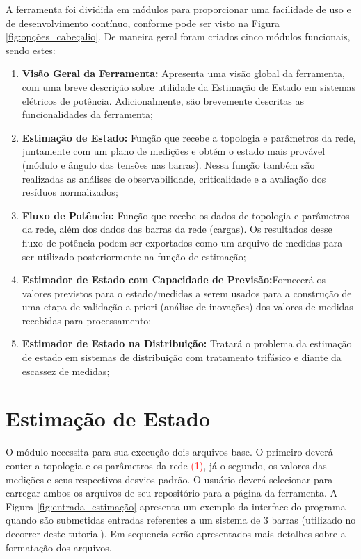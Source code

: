 \documentclass{article}
\begin{document}
A ferramenta foi dividida em módulos para proporcionar uma facilidade de uso e de desenvolvimento contínuo, conforme pode ser visto na Figura \ref{fig:opções_cabeçalio}. De maneira geral foram criados cinco módulos funcionais, sendo estes:
\begin{enumerate}
    \item \textbf{Visão Geral da Ferramenta:} Apresenta uma visão global da ferramenta, com uma breve descrição sobre utilidade da Estimação de Estado em sistemas elétricos de potência. Adicionalmente, são brevemente descritas as funcionalidades da ferramenta;
    \item \textbf{Estimação de Estado:} Função que recebe a topologia e parâmetros da rede, juntamente com um plano de medições e obtém o estado mais provável (módulo e ângulo das tensões nas barras). Nessa função também são realizadas as análises de observabilidade, criticalidade e a avaliação dos resíduos normalizados;
    \item \textbf{Fluxo de Potência:} Função que recebe os dados de topologia e parâmetros da rede, além dos dados das barras da rede (cargas). Os resultados desse fluxo de potência podem ser exportados como um arquivo de medidas para ser utilizado posteriormente na função de estimação;
    \item \textbf{Estimador de Estado com Capacidade de Previsão:}Fornecerá os valores previstos para o estado/medidas a serem usados para a construção de uma etapa de validação a priori (análise de inovações) dos valores de medidas recebidas para processamento;
    \item \textbf{Estimador de Estado na Distribuição:} Tratará o problema da estimação de estado em sistemas de distribuição com tratamento trifásico e diante da escassez de medidas;
\end{enumerate}


\section{Estimação de Estado}

O módulo  necessita para sua execução  dois arquivos base. O primeiro deverá conter a topologia e os parâmetros da rede \textcolor{red}{(1)}, já o segundo, os valores das medições e seus respectivos desvios padrão. 
O usuário deverá selecionar \say{\textcolor{blue}{Arraste ou Selecione o Arquivo}} para carregar ambos os arquivos de seu repositório para a página da ferramenta. 
 A Figura \ref{fig:entrada_estimação} apresenta um exemplo da interface do programa quando são submetidas entradas referentes a um sistema de 3 barras (utilizado no decorrer deste tutorial).
 Em sequencia serão apresentados mais detalhes sobre a formatação dos arquivos.
\end{document}
